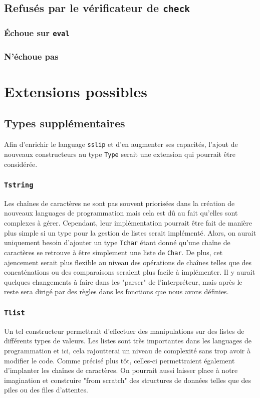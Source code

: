 \documentclass[a4paper,12pt]{article}
\begin{document}
    \subsection{Refusés par le vérificateur de \texttt{check}}
        \subsubsection{Échoue sur \texttt{eval}}
        \subsubsection{N'échoue pas}

\newpage
\section{Extensions possibles}
    \subsection{Types supplémentaires}
        Afin d'enrichir le language \texttt{sslip} et d'en augmenter ses capacités, l'ajout de 
        nouveaux constructeurs au type \texttt{Type} serait une extension qui pourrait être 
        considérée.
        \subsubsection{\texttt{Tstring}}
            Les chaînes de caractères ne sont pas souvent priorisées dans la création de nouveaux
            languages de programmation mais cela est dû au fait qu'elles sont complexes à gérer.
            Cependant, leur implémentation pourrait être fait de manière plus simple si un type
            pour la gestion de listes serait implémenté. Alors, on aurait uniquement besoin 
            d'ajouter un type \texttt{Tchar} étant donné qu'une chaîne de caractères se retrouve
            à être simplement une liste de \texttt{Char}. De plus, cet ajencement serait plus
            flexible au niveau des opérations de chaînes telles que des concaténations ou des 
            comparaisons seraient plus facile à implémenter. Il y aurait quelques changements 
            à faire dans les "parser" de l'interpréteur, mais après le reste sera dirigé par 
            des règles dans les fonctions que nous avons définies.
        \subsubsection{\texttt{Tlist}}
            Un tel constructeur permettrait d'effectuer des manipulations sur des listes
            de différents types de valeurs. Les listes sont très importantes dans les 
            languages de programmation et ici, cela rajoutterai un niveau de complexité 
            sans trop avoir à modifier le code. Comme précisé plus tôt, celles-ci permettraient
            également d'implanter les chaînes de caractères. On pourrait aussi laisser
            place à notre imagination et construire "from scratch" des structures de données
            telles que des piles ou des files d'attentes.
\end{document}

